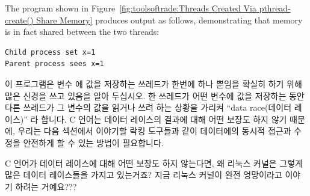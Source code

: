 The program shown in
Figure~\ref{fig:toolsoftrade:Threads Created Via pthread-create() Share Memory}
produces output as follows, demonstrating that memory is in fact
shared between the two threads:
\fi

\vspace{5pt}
\begin{minipage}[t]{\columnwidth}
\scriptsize
\begin{verbatim}
Child process set x=1
Parent process sees x=1
\end{verbatim}
\end{minipage}
\vspace{5pt}

이 프로그램은 변수  에 값을 저장하는 쓰레드가 한번에 하나 뿐임을 확실히
하기 위해 많은 신경을 쓰고 있음을 알아 두십시오.
한 쓰레드가 어떤 변수에 값을 저장하는 동안 다른 쓰레드가 그 변수의 값을 읽거나
쓰려 하는 상황을 가리켜 ``data race(데이터 레이스)'' 라 합니다.
C 언어는 데이터 레이스의 결과에 대해 어떤 보장도 하지 않기 때문에, 우리는 다음
섹션에서 이야기할 락킹 도구들과 같이 데이터에의 동시적 접근과 수정을 안전하게
할 수 있는 방법이 필요합니다.

\QuickQuiz{}
	C 언어가 데이터 레이스에 대해 어떤 보장도 하지 않는다면, 왜 리눅스
	커널은 그렇게 많은 데이터 레이스들을 가지고 있는거죠?
	지금 리눅스 커널이 완전 엉망이라고 이야기 하려는 거예요???

